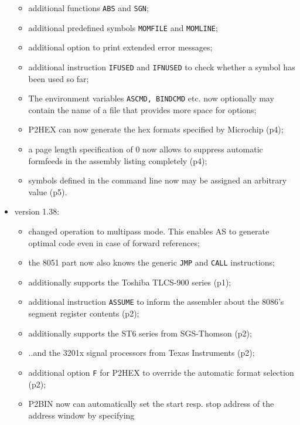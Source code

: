 \documentclass[12pt,twoside]{report}
\newcommand{\tty}[1]{{\tt #1}}
\newcommand{\asname}{{AS}}
\begin{document}
\begin{itemize}
{\begin{itemize}
{            three possibilities for the termination record;}
      \item{additional functions \tty{ABS} and \tty{SGN};}
      \item{additional predefined symbols \tty{MOMFILE} and \tty{MOMLINE};}
      \item{additional option to print extended error messages;}
      \item{additional instruction \tty{IFUSED} and \tty{IFNUSED} to check
            whether a symbol has been used so far;}
      \item{The environment variables \tty{ASCMD, BINDCMD} etc. now
            optionally may contain the name of a file that
            provides more space for options;}
      \item{P2HEX can now generate the hex formats specified
            by Microchip (p4);}
      \item{a page length specification of 0 now allows to
            suppress automatic formfeeds in the assembly listing
            completely (p4);}
      \item{symbols defined in the command line now may be
            assigned an arbitrary value (p5).}
      \end{itemize}}
\item{version 1.38:
      \begin{itemize}
      \item{changed operation to multipass mode.  This enables
            \asname{} to generate optimal code even in case of forward
            references;}
      \item{the 8051 part now also knows the generic \tty{JMP} and
            \tty{CALL} instructions;}
      \item{additionally supports the Toshiba TLCS-900 series
            (p1);}
      \item{additional instruction \tty{ASSUME} to inform the assembler
            about the 8086's segment register contents (p2);}
      \item{additionally supports the ST6 series from
            SGS-Thomson (p2);}
      \item{..and the 3201x signal processors from Texas
            Instruments (p2);}
      \item{additional option \tty{F} for P2HEX to override the
            automatic format selection (p2);}
      \item{P2BIN now can automatically set the start resp.
            stop address of the address window by specifying
}
\end{itemize}}
\end{itemize}
\end{document}
